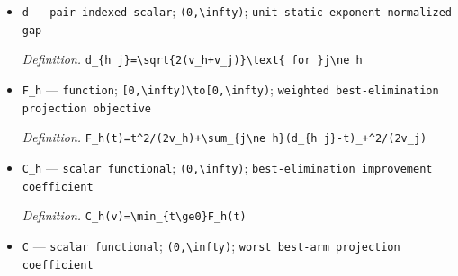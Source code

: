 \documentclass{article}
\begin{document}
\begin{itemize}
  \par\smallskip\noindent\emph{Definition.} \texttt{Q\_\allowbreak{}\{e,\allowbreak{}j\}\allowbreak{}\textasciicircum{}\{\textbackslash{}\allowbreak{}mathrm T\}\allowbreak{}(\textbackslash{}\allowbreak{}rho,\allowbreak{}\textbackslash{}\allowbreak{}mu)=\allowbreak{}\textbackslash{}\allowbreak{}inf\textbackslash{}\allowbreak{}\{R\_\allowbreak{}e(x,\allowbreak{}z;\allowbreak{}\textbackslash{}\allowbreak{}mu):\allowbreak{}x\textbackslash{}\allowbreak{}in\textbackslash{}\allowbreak{}mathcal B\_\allowbreak{}e,\allowbreak{}\textbackslash{}\allowbreak{} m\_\allowbreak{}j(e;\allowbreak{}x,\allowbreak{}z)\textbackslash{}\allowbreak{}ge m\_\allowbreak{}h(e;\allowbreak{}x,\allowbreak{}z)\textbackslash{}\allowbreak{}\}\allowbreak{}}
  \item \texttt{d} --- \texttt{pair-\allowbreak{}indexed scalar}; \texttt{(0,\allowbreak{}\textbackslash{}\allowbreak{}infty)}; \texttt{unit-\allowbreak{}static-\allowbreak{}exponent normalized gap}
  \par\smallskip\noindent\emph{Definition.} \texttt{d\_\allowbreak{}\{h j\}\allowbreak{}=\allowbreak{}\textbackslash{}\allowbreak{}sqrt\{2(v\_\allowbreak{}h+\allowbreak{}v\_\allowbreak{}j)\}\allowbreak{}\textbackslash{}\allowbreak{}text\{ for \}\allowbreak{}j\textbackslash{}\allowbreak{}ne h}
  \item \texttt{F\_\allowbreak{}h} --- \texttt{function}; \texttt{[0,\allowbreak{}\textbackslash{}\allowbreak{}infty)\textbackslash{}\allowbreak{}to[0,\allowbreak{}\textbackslash{}\allowbreak{}infty)}; \texttt{weighted best-\allowbreak{}elimination projection objective}
  \par\smallskip\noindent\emph{Definition.} \texttt{F\_\allowbreak{}h(t)=\allowbreak{}t\textasciicircum{}2/\allowbreak{}(2v\_\allowbreak{}h)+\allowbreak{}\textbackslash{}\allowbreak{}sum\_\allowbreak{}\{j\textbackslash{}\allowbreak{}ne h\}\allowbreak{}(d\_\allowbreak{}\{h j\}\allowbreak{}-\allowbreak{}t)\_\allowbreak{}+\allowbreak{}\textasciicircum{}2/\allowbreak{}(2v\_\allowbreak{}j)}
  \item \texttt{C\_\allowbreak{}h} --- \texttt{scalar functional}; \texttt{(0,\allowbreak{}\textbackslash{}\allowbreak{}infty)}; \texttt{best-\allowbreak{}elimination improvement coefficient}
  \par\smallskip\noindent\emph{Definition.} \texttt{C\_\allowbreak{}h(v)=\allowbreak{}\textbackslash{}\allowbreak{}min\_\allowbreak{}\{t\textbackslash{}\allowbreak{}ge0\}\allowbreak{}F\_\allowbreak{}h(t)}
  \item \texttt{C} --- \texttt{scalar functional}; \texttt{(0,\allowbreak{}\textbackslash{}\allowbreak{}infty)}; \texttt{worst best-\allowbreak{}arm projection coefficient}

\end{itemize}
\end{document}
